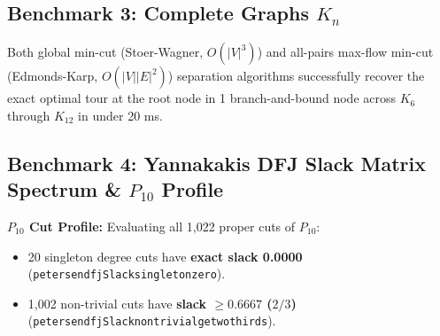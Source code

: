 \documentclass[11pt,a4paper]{article}
\renewcommand{\_}{\origunderscore\allowbreak}
\theoremstyle{plain}
\theoremstyle{definition}
\theoremstyle{remark}
\begin{document}
\subsection{Benchmark 3: Complete Graphs \texorpdfstring{$K_n$}{Kn}}
Both global min-cut (Stoer-Wagner, $O(|V|^3)$) and all-pairs max-flow min-cut (Edmonds-Karp, $O(|V||E|^2)$) separation algorithms successfully recover the exact optimal tour at the root node in 1 branch-and-bound node across $K_6$ through $K_{12}$ in under 20 ms.

\subsection{Benchmark 4: Yannakakis DFJ Slack Matrix Spectrum \& \texorpdfstring{$P_{10}$}{P10} Profile}
\begin{table}[htbp]
\centering
\caption{Yannakakis DFJ Subtour Slack Matrices $S_{\text{DFJ}}(n)$ on Complete Graphs $K_n$.}
\label{tab:yannakakis_slack}
\end{table}

\textbf{$P_{10}$ Cut Profile:} Evaluating all 1,022 proper cuts of $P_{10}$:
\begin{itemize}
  \item 20 singleton degree cuts have \textbf{exact slack 0.0000} (\texttt{petersen\_dfjSlack\_singleton\_zero}).
  \item 1,002 non-trivial cuts have \textbf{slack $\ge 0.6667$ ($2/3$)} (\texttt{petersen\_dfjSlack\_nontrivial\_ge\_two\_thirds}).
\end{itemize}
\end{document}
